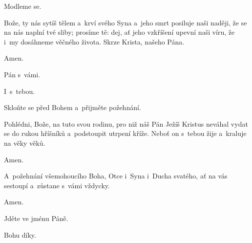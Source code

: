 \mbox{}

Modleme se.

Bože, ty nás sytíš tělem a~krví svého Syna a~jeho smrt posiluje naši naději, že se na nás naplní tvé sliby; prosíme tě: dej, ať jeho vzkříšení upevní naši víru, že i~my dosáhneme věčného života. Skrze Krista, našeho Pána.

\Rbardot{} Amen.

\mbox{}

\Vbardot{} Pán s~vámi.

\Rbardot{} I~s~tebou.

\Vbardot{} Skloňte se před Bohem a~přijměte požehnání.

\mbox{}

Pohlédni, Bože, na tuto svou rodinu, pro niž náš Pán Ježíš Kristus neváhal vydat se do rukou hříšníků a~podstoupit utrpení kříže. Neboť on s~tebou žije a~kraluje na věky věků.

\Rbardot{} Amen.

A~požehnání všemohoucího Boha, Otce i~Syna \grecross{} i~Ducha svatého, ať na vás sestoupí a~zůstane s~vámi vždycky.

\Rbardot{} Amen.

\Vbardot{} Jděte ve jménu Páně.

\Rbardot{} Bohu díky.
